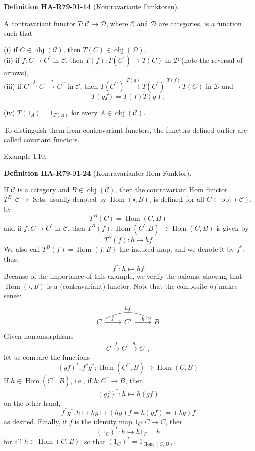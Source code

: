 \documentclass[10pt, letterpaper]{article}
\newcommand{\CustomHeading}[3]{%
  \par\medskip\noindent%
  \textbf{#1 #2} \textnormal{(#3)}.\enskip%
}
\newenvironment{DEF}[2]{\begin{unitbox}\CustomHeading{Definition}{#1}{#2}}{\end{unitbox}}
\begin{document}
\begin{DEF}{HA-R79-01-14}{Kontravariante Funktoren}
A contravariant functor $T: \mathcal{C} \rightarrow \mathcal{D}$, where $\mathcal{C}$ and $\mathcal{D}$ are categories, is a function such that

(i) if $C \in \operatorname{obj}(\mathcal{C})$, then $T(C) \in \operatorname{obj}(\mathcal{D})$,\\

(ii) if $f: C \rightarrow C^{\prime}$ in $\mathcal{C}$, then $T(f): T\left(C^{\prime}\right) \rightarrow T(C)$ in $\mathcal{D}$ (note the reversal of arrows),\\

(iii) if $C \xrightarrow{f} C^{\prime} \xrightarrow{g} C^{\prime \prime}$ in $\mathcal{C}$, then $T\left(C^{\prime \prime}\right) \xrightarrow{T(g)} T\left(C^{\prime}\right) \xrightarrow{T(f)} T(C)$ in $\mathcal{D}$ and
$$
T(g f)=T(f) T(g),
$$

(iv) $T\left(1_{A}\right)=1_{T(A)}$ for every $A \in \operatorname{obj}(\mathcal{C})$.
\end{DEF}


To distinguish them from contravariant functors, the functors defined earlier are called covariant functors.

Example 1.10. 



\begin{DEF}{HA-R79-01-24}{Kontravarianter Hom-Funktor}
If $\mathcal{C}$ is a category and $B \in \operatorname{obj}(\mathcal{C})$, then the contravariant Hom functor $T^{B}: \mathcal{C} \rightarrow$ Sets, usually denoted by $\operatorname{Hom}(\square, B)$, is defined, for all $C \in \operatorname{obj}(\mathcal{C})$, by
$$
T^{B}(C)=\operatorname{Hom}(C, B)
$$
and if $f: C \rightarrow C^{\prime}$ in $\mathcal{C}$, then $T^{B}(f): \operatorname{Hom}\left(C^{\prime}, B\right) \rightarrow \operatorname{Hom}(C, B)$ is given by
$$
T^{B}(f): h \mapsto h f
$$
We also call $T^{B}(f)=\operatorname{Hom}(f, B)$ the induced map, and we denote it by $f^{*}$; thus,
$$
f^{*}: h \mapsto h f
$$
Because of the importance of this example, we verify the axioms, showing that $\operatorname{Hom}(\square, B)$ is a (contravariant) functor. Note that the composite $h f$ makes sense:
\[
\begin{tikzcd}[row sep=small]
C \arrow[r, "f"] \arrow[rr, bend left=30, "hf"] & C' \arrow[r, "h"] & B
\end{tikzcd}
\]
Given homomorphisms
$$
C \xrightarrow{f} C^{\prime} \xrightarrow{g} C^{\prime \prime},
$$
let us compare the functions
$$
(g f)^{*}, f^{*} g^{*}: \operatorname{Hom}\left(C^{\prime \prime}, B\right) \rightarrow \operatorname{Hom}(C, B)
$$
If $h \in \operatorname{Hom}\left(C^{\prime \prime}, B\right)$, i.e., if $h: C^{\prime \prime} \rightarrow B$, then
$$
(g f)^{*}: h \mapsto h(g f)
$$
on the other hand,
$$
f^{*} g^{*}: h \mapsto h g \mapsto(h g) f=h(g f)=(h g) f
$$
as desired. Finally, if $f$ is the identity map $1_{C}: C \rightarrow C$, then
$$
\left(1_{C}\right)^{*}: h \mapsto h 1_{C}=h
$$
for all $h \in \operatorname{Hom}(C, B)$, so that $\left(1_{C}\right)^{*}=1_{\operatorname{Hom}(C, B)}$.
\end{DEF}
\end{document}
